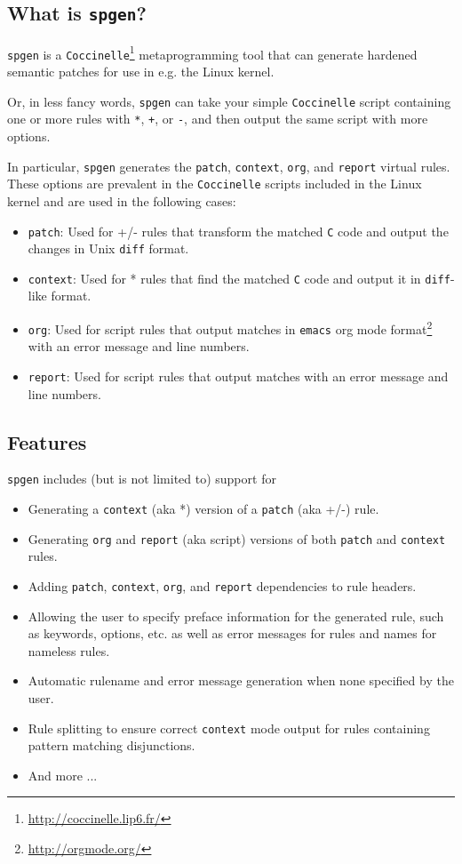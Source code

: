 \subsection{What is \texttt{spgen}?}
\texttt{spgen} is a \texttt{Coccinelle}\footnote{\url{http://coccinelle.lip6.fr/}} metaprogramming tool that can generate hardened semantic patches for use in e.g. the Linux kernel.

Or, in less fancy words, \texttt{spgen} can take your simple \texttt{Coccinelle} script containing one or more rules with \texttt{*}, \texttt{+}, or \texttt{-}, and then output the same script with more options.

In particular, \texttt{spgen} generates the \texttt{patch}, \texttt{context}, \texttt{org}, and \texttt{report} virtual rules. These options are prevalent in the \texttt{Coccinelle} scripts included in the Linux kernel and are used in the following cases:

\begin{itemize}
\item \texttt{patch}: Used for +/- rules that transform the matched \texttt{C} code and output the changes in Unix \texttt{diff} format.
\item \texttt{context}: Used for * rules that find the matched \texttt{C} code and output it in \texttt{diff}-like format.
\item \texttt{org}: Used for script rules that output matches in
  \texttt{emacs} org mode
  format\footnote{\url{http://orgmode.org/}} with
  an error message and line numbers.
\item \texttt{report}: Used for script rules that output matches with an error message and line numbers.
\end{itemize}
\bigskip

\subsection{Features}
\texttt{spgen} includes (but is not limited to) support for
\begin{itemize}
\item Generating a \texttt{context} (aka *) version of a \texttt{patch} (aka +/-) rule.
\item Generating \texttt{org} and \texttt{report} (aka script) versions of both \texttt{patch} and \texttt{context} rules.
\item Adding \texttt{patch}, \texttt{context}, \texttt{org}, and \texttt{report} dependencies to rule headers.
\item Allowing the user to specify preface information for the generated rule, such as keywords, options, etc. as well as error messages for rules and names for nameless rules.
\item Automatic rulename and error message generation when none specified by the user.
\item Rule splitting to ensure correct \texttt{context} mode output for rules containing pattern matching disjunctions.
\item And more ...
\end{itemize}
